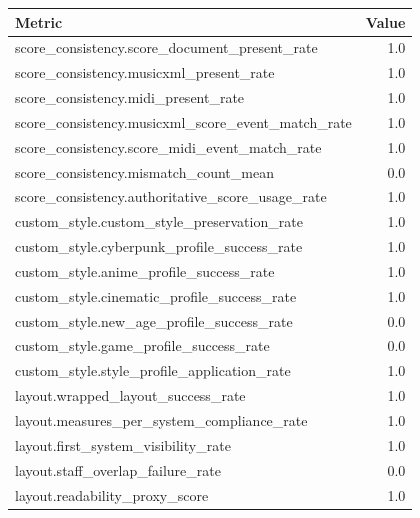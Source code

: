 \begin{tabular}{lr}
Metric & Value \\
\hline
score_consistency.score_document_present_rate & 1.0 \\
score_consistency.musicxml_present_rate & 1.0 \\
score_consistency.midi_present_rate & 1.0 \\
score_consistency.musicxml_score_event_match_rate & 1.0 \\
score_consistency.score_midi_event_match_rate & 1.0 \\
score_consistency.mismatch_count_mean & 0.0 \\
score_consistency.authoritative_score_usage_rate & 1.0 \\
custom_style.custom_style_preservation_rate & 1.0 \\
custom_style.cyberpunk_profile_success_rate & 1.0 \\
custom_style.anime_profile_success_rate & 1.0 \\
custom_style.cinematic_profile_success_rate & 1.0 \\
custom_style.new_age_profile_success_rate & 0.0 \\
custom_style.game_profile_success_rate & 0.0 \\
custom_style.style_profile_application_rate & 1.0 \\
layout.wrapped_layout_success_rate & 1.0 \\
layout.measures_per_system_compliance_rate & 1.0 \\
layout.first_system_visibility_rate & 1.0 \\
layout.staff_overlap_failure_rate & 0.0 \\
layout.readability_proxy_score & 1.0 \\
\end{tabular}
